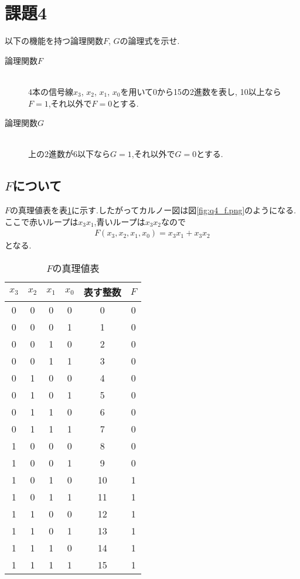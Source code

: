 \section{課題4}
以下の機能を持つ論理関数$F$, $G$の論理式を示せ.
\begin{description}
  \item[論理関数$F$]\mbox{}\\4本の信号線$x_3$, $x_2$, $x_1$, $x_0$を用いて0から15の2進数を表し,
10以上なら$F=1$,それ以外で$F=0$とする.
  \item[論理関数$G$]\mbox{}\\上の2進数が6以下なら$G=1$,それ以外で$G=0$とする.
\end{description}
\subsection{$F$について}
$F$の真理値表を表\ref{tab:q4_f}に示す.したがってカルノー図は図\ref{fig:q4_f.png}のようになる.
ここで赤いループは$x_3x_1$,青いループは$x_3x_2$なので
\begin{align*}
  F(x_3,x_2,x_1,x_0)=x_3x_1+x_3x_2
\end{align*}
となる.
\begin{table}[h]
\caption{$F$の真理値表}
\label{tab:q4_f}
\centering
\begin{tabular}{cccccc}
\hline
$x_3$&$x_2$&$x_1$&$x_0$&表す整数&$F$\\
\hline \hline
0 & 0 & 0 & 0 & 0 & 0 \\
0 & 0 & 0 & 1 & 1 & 0 \\
0 & 0 & 1 & 0 & 2 & 0 \\
0 & 0 & 1 & 1 & 3 & 0 \\
0 & 1 & 0 & 0 & 4 & 0 \\
0 & 1 & 0 & 1 & 5 & 0 \\
0 & 1 & 1 & 0 & 6 & 0 \\
0 & 1 & 1 & 1 & 7 & 0 \\
1 & 0 & 0 & 0 & 8 & 0 \\
1 & 0 & 0 & 1 & 9 & 0 \\
1 & 0 & 1 & 0 & 10 & 1 \\
1 & 0 & 1 & 1 & 11 & 1 \\
1 & 1 & 0 & 0 & 12 & 1 \\
1 & 1 & 0 & 1 & 13 & 1 \\
1 & 1 & 1 & 0 & 14 & 1 \\
1 & 1 & 1 & 1 & 15 & 1 \\
\hline
\end{tabular}
\end{table}

